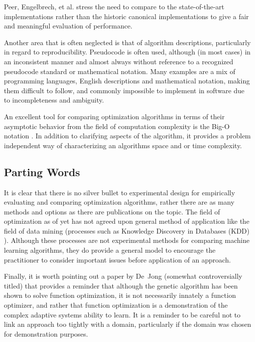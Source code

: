 Peer, Engelbrech, et al. \cite{Peer2003} stress the need to compare to the state-of-the-art implementations rather than the historic canonical implementations to give a fair and meaningful evaluation of performance.

Another area that is often neglected is that of algorithm descriptions, particularly in regard to reproducibility. Pseudocode is often used, although (in most cases) in an inconsistent manner and almost always without reference to a recognized pseudocode standard or mathematical notation. Many examples are a mix of programming languages, English descriptions and mathematical notation, making them difficult to follow, and commonly impossible to implement in software due to incompleteness and ambiguity.

An excellent tool for comparing optimization algorithms in terms of their asymptotic behavior from the field of computation complexity is the Big-O notation \cite{Cormen2001}. In addition to clarifying aspects of the algorithm, it provides a problem independent way of characterizing an algorithms space and or time complexity.


% 
% 
\subsection{Parting Words}
It is clear that there is no silver bullet to experimental design for empirically evaluating and comparing optimization algorithms, rather there are as many methods and options as there are publications on the topic. The field of optimization as of yet has not agreed upon general method of application like the field of data mining (processes such as Knowledge Discovery in Databases (KDD) \cite{Fayyad1996}). Although these processes are not experimental methods for comparing machine learning algorithms, they do provide a general model to encourage the practitioner to consider important issues before application of an approach.

Finally, it is worth pointing out a paper by De~Jong \cite{Jong1992} (somewhat controversially titled) that provides a reminder that although the genetic algorithm has been shown to solve function optimization, it is not necessarily innately a function optimizer, and rather that function optimization is a demonstration of the complex adaptive systems ability to learn. It is a reminder to be careful not to link an approach too tightly with a domain, particularly if the domain was chosen for demonstration purposes.